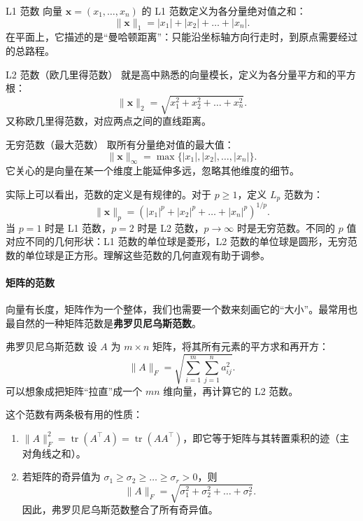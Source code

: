 \begin{definition}{L1 范数}{}
    向量 \(\mathbf{x} = (x_1, \dots, x_n)\) 的 L1 范数定义为各分量绝对值之和：
    \[
        \|\mathbf{x}\|_1 = |x_1| + |x_2| + \dots + |x_n|.
    \]
    在平面上，它描述的是“曼哈顿距离”：只能沿坐标轴方向行走时，到原点需要经过的总路程。
\end{definition}

\begin{definition}{L2 范数（欧几里得范数）}{}
    就是高中熟悉的向量模长，定义为各分量平方和的平方根：
    \[
        \|\mathbf{x}\|_2 = \sqrt{x_1^2 + x_2^2 + \dots + x_n^2}.
    \]
    又称欧几里得范数，对应两点之间的直线距离。
\end{definition}

\begin{definition}{无穷范数（最大范数）}{}
    取所有分量绝对值的最大值：
    \[
        \|\mathbf{x}\|_\infty = \max\{|x_1|, |x_2|, \dots, |x_n|\}.
    \]
    它关心的是向量在某一个维度上能延伸多远，忽略其他维度的细节。
\end{definition}

实际上可以看出，范数的定义是有规律的。对于 \(p \ge 1\)，定义 \(L_p\) 范数为：
\[
    \|\mathbf{x}\|_p = \left( |x_1|^p + |x_2|^p + \dots + |x_n|^p \right)^{1/p}.
\]
当 \(p=1\) 时是 L1 范数，\(p=2\) 时是 L2 范数，\(p \to \infty\) 时是无穷范数。不同的 \(p\) 值对应不同的几何形状：L1 范数的单位球是菱形，L2 范数的单位球是圆形，无穷范数的单位球是正方形。理解这些范数的几何直观有助于调参。

\paragraph{矩阵的范数}

向量有长度，矩阵作为一个整体，我们也需要一个数来刻画它的“大小”。最常用也最自然的一种矩阵范数是\textbf{弗罗贝尼乌斯范数}。

\begin{definition}{弗罗贝尼乌斯范数}{}
    设 \(A\) 为 \(m \times n\) 矩阵，将其所有元素的平方求和再开方：
    \[
        \|A\|_F = \sqrt{\sum_{i=1}^m \sum_{j=1}^n a_{ij}^2}.
    \]
    可以想象成把矩阵“拉直”成一个 \(mn\) 维向量，再计算它的 L2 范数。
\end{definition}

这个范数有两条极有用的性质：
\begin{enumerate}
    \item \(\|A\|_F^2 = \operatorname{tr}(A^\top A) = \operatorname{tr}(A A^\top)\)，即它等于矩阵与其转置乘积的迹（主对角线之和）。
    \item 若矩阵的奇异值为 \(\sigma_1 \ge \sigma_2 \ge \dots \ge \sigma_r > 0\)，则
        \[
            \|A\|_F = \sqrt{\sigma_1^2 + \sigma_2^2 + \dots + \sigma_r^2}.
        \]
        因此，弗罗贝尼乌斯范数整合了所有奇异值。
\end{enumerate}

